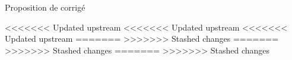 
\vspace{0.1cm}
\begin{huge}
 Proposition de corrigé
\end{huge}



<<<<<<< Updated upstream
<<<<<<< Updated upstream
<<<<<<< Updated upstream
=======
>>>>>>> Stashed changes
=======
>>>>>>> Stashed changes
=======
>>>>>>> Stashed changes





